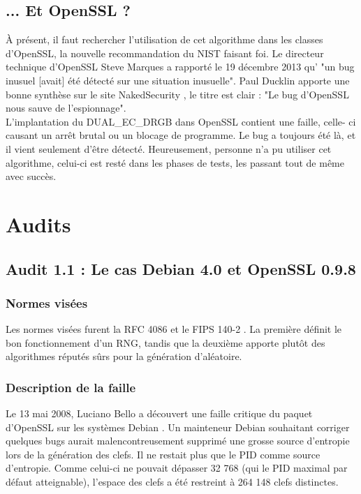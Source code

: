 	\subsection{... Et OpenSSL ?}
	
	À présent, il faut rechercher l'utilisation de cet algorithme dans les classes d'OpenSSL, la nouvelle recommandation du NIST faisant foi. Le directeur technique d'OpenSSL Steve Marques a rapporté le 19 décembre 2013 qu' "un bug inusuel [avait] été détecté sur une situation inusuelle". Paul Ducklin apporte une bonne synthèse sur le site NakedSecurity \cite{duckin2013openssl}, le titre est clair : "Le bug d'OpenSSL nous sauve de l'espionnage".\\
	
	
	L'implantation du DUAL\_EC\_DRGB dans OpenSSL contient une faille, celle- ci causant un arrêt brutal ou un blocage de programme. Le bug a toujours été là, et il vient seulement d'être détecté.	 Heureusement, personne n'a pu utiliser cet algorithme, celui-ci est resté dans les phases de tests, les passant tout de même avec succès.\\

\section{Audits}
	\subsection{Audit 1.1 : Le cas Debian 4.0 et OpenSSL 0.9.8}
		\subsubsection{Normes visées}
			Les normes visées furent la RFC 4086 \cite{rfc4086} et le FIPS 140-2 \cite{fips140-2}. La première définit le bon fonctionnement d'un RNG, tandis que la deuxième apporte plutôt des algorithmes réputés sûrs pour la génération d'aléatoire.
		
		\subsubsection{Description de la faille}
			Le 13 mai 2008, Luciano Bello a découvert une faille critique du paquet d'OpenSSL sur les systèmes Debian \cite{faille2008linux.org}. Un mainteneur Debian souhaitant corriger quelques bugs aurait malencontreusement supprimé une grosse source d'entropie lors de la génération des clefs. Il ne restait plus que le PID comme source d'entropie. Comme celui-ci ne pouvait dépasser 32 768 (qui le PID maximal par défaut atteignable), l'espace des clefs a été restreint à 264 148 clefs distinctes.\\
		
